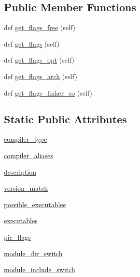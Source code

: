 \subsection*{Public Member Functions}
\begin{DoxyCompactItemize}
\item 
def \hyperlink{classnumpy_1_1distutils_1_1fcompiler_1_1intel_1_1IntelFCompiler_a8ce61a59d4c679e43a0ac12334fe52ca}{get\+\_\+flags\+\_\+free} (self)
\item 
def \hyperlink{classnumpy_1_1distutils_1_1fcompiler_1_1intel_1_1IntelFCompiler_affd02ae376574d64c4fb312fc6be44eb}{get\+\_\+flags} (self)
\item 
def \hyperlink{classnumpy_1_1distutils_1_1fcompiler_1_1intel_1_1IntelFCompiler_ae6b6bf9be9011cc209adac12a6c967d0}{get\+\_\+flags\+\_\+opt} (self)
\item 
def \hyperlink{classnumpy_1_1distutils_1_1fcompiler_1_1intel_1_1IntelFCompiler_aaed72ff6fb2c73f64eb1f0e2314e9f17}{get\+\_\+flags\+\_\+arch} (self)
\item 
def \hyperlink{classnumpy_1_1distutils_1_1fcompiler_1_1intel_1_1IntelFCompiler_aa47d4210115a777b5d40da2a6897a81b}{get\+\_\+flags\+\_\+linker\+\_\+so} (self)
\end{DoxyCompactItemize}
\subsection*{Static Public Attributes}
\begin{DoxyCompactItemize}
\item 
\hyperlink{classnumpy_1_1distutils_1_1fcompiler_1_1intel_1_1IntelFCompiler_ae0a9ffe47c88265825f48ed5dcebb919}{compiler\+\_\+type}
\item 
\hyperlink{classnumpy_1_1distutils_1_1fcompiler_1_1intel_1_1IntelFCompiler_a1767d9a9dac61c88964ccf1a2dcf53a9}{compiler\+\_\+aliases}
\item 
\hyperlink{classnumpy_1_1distutils_1_1fcompiler_1_1intel_1_1IntelFCompiler_a9f66aef07ab670d9f065f783a8f3b58e}{description}
\item 
\hyperlink{classnumpy_1_1distutils_1_1fcompiler_1_1intel_1_1IntelFCompiler_acf987b8304036441b39ec42cb2f4b701}{version\+\_\+match}
\item 
\hyperlink{classnumpy_1_1distutils_1_1fcompiler_1_1intel_1_1IntelFCompiler_a730664c26a5c59489853af2492a9e8f5}{possible\+\_\+executables}
\item 
\hyperlink{classnumpy_1_1distutils_1_1fcompiler_1_1intel_1_1IntelFCompiler_a628c894ce3212ec58ff335d397cbb71e}{executables}
\item 
\hyperlink{classnumpy_1_1distutils_1_1fcompiler_1_1intel_1_1IntelFCompiler_ae66934fe434541d853cfbca7c848fa48}{pic\+\_\+flags}
\item 
\hyperlink{classnumpy_1_1distutils_1_1fcompiler_1_1intel_1_1IntelFCompiler_a2b2aa73cf3545c613848f7f8fec3735c}{module\+\_\+dir\+\_\+switch}
\item 
\hyperlink{classnumpy_1_1distutils_1_1fcompiler_1_1intel_1_1IntelFCompiler_aa5621aa59084fce304cb5e807da9edf7}{module\+\_\+include\+\_\+switch}
\end{DoxyCompactItemize}


